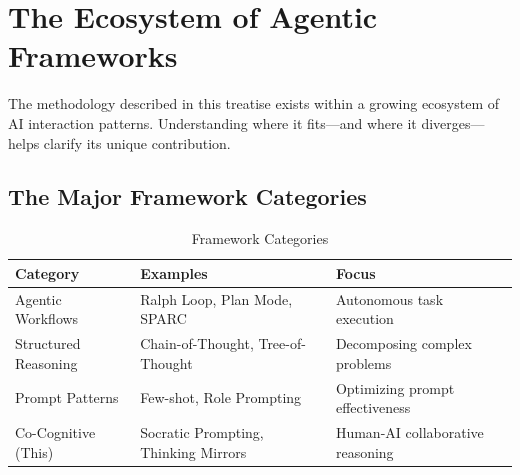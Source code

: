 \chapter{The Ecosystem of Agentic Frameworks}

The methodology described in this treatise exists within a growing ecosystem of AI interaction patterns. Understanding where it fits---and where it diverges---helps clarify its unique contribution.

\section{The Major Framework Categories}

\begin{table}[H]
\centering
\begin{tabular}{lll}
\toprule
\textbf{Category} & \textbf{Examples} & \textbf{Focus} \\
\midrule
Agentic Workflows & Ralph Loop, Plan Mode, SPARC & Autonomous task execution \\
Structured Reasoning & Chain-of-Thought, Tree-of-Thought & Decomposing complex problems \\
Prompt Patterns & Few-shot, Role Prompting & Optimizing prompt effectiveness \\
Co-Cognitive (This) & Socratic Prompting, Thinking Mirrors & Human-AI collaborative reasoning \\
\bottomrule
\end{tabular}
\caption{Framework Categories}
\end{table}

